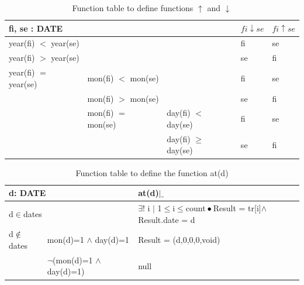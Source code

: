 \documentclass[runningheads,12pt]{article}
\begin{document}




\begin{table}[H]
{
\centering

\begin{tabular}{|l|l|l||l|l|}
\hline
\multicolumn{3}{|l||}{fi, se : DATE} & $fi \downarrow se$ & $fi \uparrow se$\\ 

\hline
\multicolumn{3}{|l||}{year(fi) $<$ year(se)} & fi & se\\ 

\hline
\multicolumn{3}{|l||}{year(fi) $>$ year(se)} & se & fi\\ 

\hline
year(fi) $=$ year(se) & \multicolumn{2}{|l||}{mon(fi) $<$ mon(se)} & fi & se\\ 

\cline{2-5}
& \multicolumn{2}{|l||}{mon(fi) $>$ mon(se)} & se & fi\\

\cline{2-5}
& mon(fi) $=$ mon(se) & day(fi) $<$ day(se) & fi & se\\

\cline{3-5}
& & day(fi) $\ge$ day(se) & se &  fi\\

\hline
\end{tabular}

\caption{Function table to define functions $\uparrow$ and $\downarrow$}
\label{table:table_bench}
}
\end{table}
\begin{table}[H]
{
\centering

\begin{tabular}{|l|l||l|}
\hline
\multicolumn{2}{|l||}{d: DATE} & at(d)$|\_$\\ 

\hline
\multicolumn{2}{|l||}{d$\in$dates} & $\exists$! i $|$ 1$\le$i$\le$count$\,\bullet\,$Result = tr[i]$\wedge$Result.date = d\\ 

\hline
d$\notin$dates & mon(d)=1 $\wedge$ day(d)=1 & Result = (d,0,0,0,void)\\

\cline{2-3}
& $\lnot$(mon(d)=1 $\wedge$ day(d)=1) & null\\

%
%
%
\hline
\end{tabular}

\caption{Function table to define the function at(d)}
\label{table:table_ROI}
}
\end{table}
\end{document}

